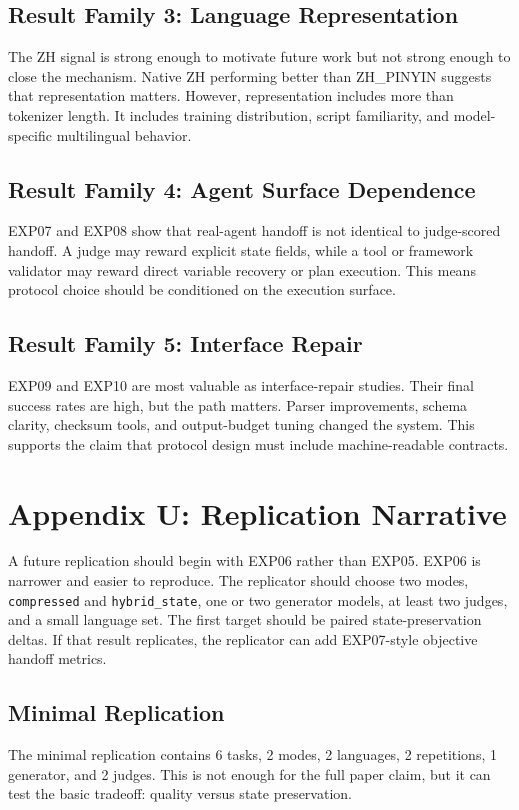 \documentclass[11pt]{article}
\begin{document}
\subsection{Result Family 3: Language Representation}
The ZH signal is strong enough to motivate future work but not strong enough to close the mechanism. Native ZH performing better than ZH\_PINYIN suggests that representation matters. However, representation includes more than tokenizer length. It includes training distribution, script familiarity, and model-specific multilingual behavior.

\subsection{Result Family 4: Agent Surface Dependence}
EXP07 and EXP08 show that real-agent handoff is not identical to judge-scored handoff. A judge may reward explicit state fields, while a tool or framework validator may reward direct variable recovery or plan execution. This means protocol choice should be conditioned on the execution surface.

\subsection{Result Family 5: Interface Repair}
EXP09 and EXP10 are most valuable as interface-repair studies. Their final success rates are high, but the path matters. Parser improvements, schema clarity, checksum tools, and output-budget tuning changed the system. This supports the claim that protocol design must include machine-readable contracts.

\clearpage
\section{Appendix U: Replication Narrative}
A future replication should begin with EXP06 rather than EXP05. EXP06 is narrower and easier to reproduce. The replicator should choose two modes, \texttt{compressed} and \texttt{hybrid\_state}, one or two generator models, at least two judges, and a small language set. The first target should be paired state-preservation deltas. If that result replicates, the replicator can add EXP07-style objective handoff metrics.

\subsection{Minimal Replication}
The minimal replication contains 6 tasks, 2 modes, 2 languages, 2 repetitions, 1 generator, and 2 judges. This is not enough for the full paper claim, but it can test the basic tradeoff: quality versus state preservation.
\end{document}
